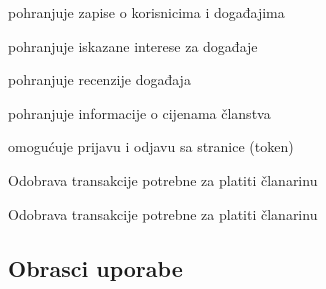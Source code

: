 \begin{packed_enum}
\begin{packed_enum}
\begin{packed_enum}
					\end{packed_enum}
					
				\end{packed_enum}
				
				\item  {}	
							
				\begin{packed_enum}				
				
					\item pohranjuje zapise o korisnicima i događajima
					\item pohranjuje iskazane interese za događaje
					\item pohranjuje recenzije događaja			
					\item pohranjuje informacije o cijenama članstva
					\item omogućuje prijavu i odjavu sa stranice (token)
				\end{packed_enum}

				\item  {}

				\begin{packed_enum}

				\item Odobrava transakcije potrebne za platiti članarinu

				\end{packed_enum}				
				
				\item  {}				
				
				\begin{packed_enum}
						
				\item Odobrava transakcije potrebne za platiti članarinu 					
					
				\end{packed_enum}
			    
			   
					

												
			\end{packed_enum}
			
	
			\eject 
			
			
				
			\subsection{Obrasci uporabe}
							


